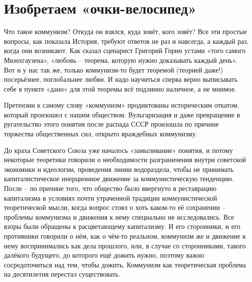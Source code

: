 \documentclass[12pt,a4paper,openany]{book}
\begin{document}
\ifSubfilesClassLoaded{\setcounter{page}{4}}{}
\section{Изобретаем «очки-велосипед»}
\label{sec:01_izobretaem_ochki}

Что такое коммунизм? Откуда он взялся, куда зовёт, кого зовёт? Все эти простые вопросы, как показала История, требуют ответов не раз и навсегда, а каждый раз, когда они возникают. Как сказал сценарист Григорий Горин устами «того самого Мюнхгаузена», «любовь – теорема, которую нужно доказывать каждый день». Вот и у нас так же, только коммунизм-то будет теоремой (теорией даже!) посерьёзнее, поглобальнее любви. И надо научиться сперва верно выписывать себе в пункте «дано» для этой теоремы всё подлинно наличное, а не мнимое.

Претензии к самому слову «коммунизм» продиктованы историческим откатом, который произошел с нашим обществом. Вульгаризация и даже превращение в ругательство этого понятия после распада СССР произошла по причине торжества общественных сил, открыто враждебных коммунизму.

До краха Советского Союза уже началось «замыливание» понятия, и потому некоторые теоретики говорили о необходимости разграничения внутри советской экономики и идеологии, проведения линии водораздела, чтобы не принимать капиталистическое инерционное движение за коммунистическую тенденцию. После – по причине того, что общество было ввергнуто в реставрацию капитализма в условиях почти утраченной традиции коммунистической теоретической мысли, когда вопрос стоял о хоть каком-то её сохранении – проблемы коммунизма и движения к нему специально не исследовались. Все взоры были обращены к расцветающему капитализму. И его сторонники, и его противники говорили о нём, как о чём-то реальном, коммунизм же и движение к нему воспринимались как дела прошлого, или, в случае со сторонниками, такого далёкого будущего, до которого ещё дожить нужно, поэтому важно сосредоточиться над тем, чтобы дожить. Коммунизм как теоретическая проблема на десятилетия перестал существовать.
\end{document}

